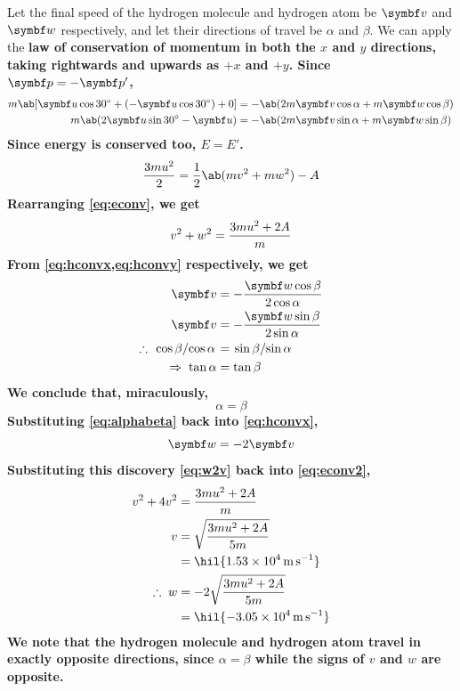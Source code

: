 Let the final speed of the hydrogen molecule and hydrogen atom be
\(\mv{v}\) and \(\mv{w}\) respectively,
and let their directions of travel be \(\alpha\) and \(\beta\).
We can apply the \bf{law of conservation of momentum} in both the
\(x\) and \(y\) directions,
taking rightwards and upwards as \(+x\) and \(+y\). Since \(\mv{p} = -\mv{p}'\),
\begin{align}
  \label{eq:hconvx}
  m\ab[\mv{u}\cos\qty{30}{\degree} + (-\mv{u}\cos\qty{30}{\degree}) +
  0] &= -\ab(2m\mv{v}\cos\alpha + m\mv{w}\cos\beta) \\
  \label{eq:hconvy}
  m\ab(2\mv{u}\sin\qty{30}{\degree}-\mv{u}) &=
  -\ab(2m\mv{v}\sin\alpha + m\mv{w}\sin\beta)
\end{align}
Since energy is conserved too, \(E = E'\).
\begin{equation}
  \f{3mu^2}{2} = \f{1}{2}\ab(mv^2 + mw^2) - A
  \label{eq:econv}
\end{equation}
Rearranging \cref{eq:econv}, we get
\begin{equation}
  v^2 + w^2 = \frac{3mu^2 + 2A}{m}
  \label{eq:econv2}
\end{equation}
From \cref{eq:hconvx,eq:hconvy} respectively, we get
\begin{align*}
  \mv{v} &= -\f{\mv{w}\cos\beta}{2\cos\alpha} \\
  \mv{v} &= -\f{\mv{w}\sin\beta}{2\sin\alpha} \\
  \therefore\; \lf{\cos\beta}{\cos\alpha} &= \lf{\sin\beta}{\sin\alpha} \\
  \Rightarrow\; \tan\alpha &= \tan\beta
\end{align*}
We conclude that, miraculously,
\begin{equation}
  \alpha = \beta
  \label{eq:alphabeta}
\end{equation}
Substituting \cref{eq:alphabeta} back into \cref{eq:hconvx},
\begin{equation}
  \mv{w} = -2\mv{v}
  \label{eq:w2v}
\end{equation}
Substituting this  discovery \cref{eq:w2v} back into
\ref{eq:econv2},
\begin{align*}
  v^2 + 4v^2 &= \f{3mu^2+2A}{m} \\
  v &= \sqrt{\f{3mu^2+2A}{5m}} \\
  &= \hil{\qty{1.53e4}{\metre\per\second}}\\
  \therefore\; w &= -2\sqrt{\f{3mu^2+2A}{5m}}\\
  &= \hil{\qty{-3.05e4}{\metre\per\second}}
\end{align*}
We note that the hydrogen molecule and hydrogen atom travel in
exactly opposite directions, since \(\alpha=\beta\) while the signs
of \(v\) and \(w\)
are opposite.
